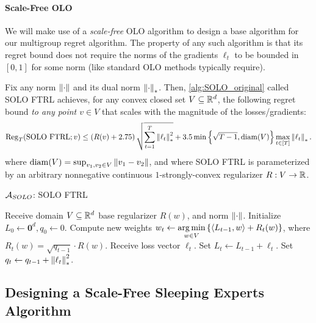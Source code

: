 \paragraph{Scale-Free OLO} We will make use of a \emph{scale-free} OLO algorithm \citep{orabona2018scale} to design a base algorithm for our multigroup regret algorithm. The property of any such algorithm is that its regret bound does not require the norms of the gradients $\ell_t$ to be bounded in $[0, 1]$ for some norm (like standard OLO methods typically require).

\begin{fact} \label{fact:scale-free}
   Fix any norm $\left\lVert\cdot\right\rVert$ and its dual norm $\left\lVert\cdot\right\rVert_*$. Then, \cref{alg:SOLO_original} called SOLO FTRL  achieves, for any convex closed set $V \subseteq \mathbb{R}^d$, the following regret bound \emph{to any point $v \in V$} that scales with the magnitude of the losses/gradients:
   \[
   \mathrm{Reg}_T(\mathrm{SOLO \ FTRL}; v) \leq \left(R(v) + 2.75\right) \sqrt{\sum_{t=1}^T \left\lVert\ell_t\right\rVert^2_* } + 3.5 \min \left\{ \sqrt{T-1}, \mathrm{diam}(V) \right\} \max_{t \in [T]} \left\lVert\ell_t\right\rVert_*.
   \]
   where $\mathrm{diam}(V) = \sup_{v_1, v_2 \in V} \left\lVert v_1-v_2\right\rVert$, and where SOLO FTRL is parameterized by an arbitrary nonnegative continuous $1$-strongly-convex regularizer $R: V \to \mathbb{R}$.
\end{fact}

\begin{algorithm}
\caption{$\mathcal{A}_{SOLO}$: SOLO FTRL \citep{orabona2018scale}}
\label{alg:SOLO_original}

\begin{algorithmic}
\STATE Receive domain $V \subseteq \mathbb{R}^d$ base regularizer $R(w)$, and norm $\left\lVert\cdot\right\rVert$.
\STATE Initialize $L_0 \gets \textbf{0}^d, q_0 \gets 0$.
    \STATE Compute new weights $w_t \gets \operatorname*{arg\,min}\limits_{w \in V} \left\{\langle L_{t-1}, w \rangle + R_t(w) \right\}$, where $R_t(w) = \sqrt{q_{t-1}} \cdot R(w)$.
    \STATE Receive loss vector $\ell_t$.
    \STATE Set $L_t \gets L_{t-1} + \ell_t$.
    \STATE Set $q_t \gets q_{t-1} + \left\lVert\ell_{t}\right\rVert^2_*$.
\ENDFOR
\end{algorithmic}
\end{algorithm}


\subsection{Designing a Scale-Free Sleeping Experts Algorithm}

